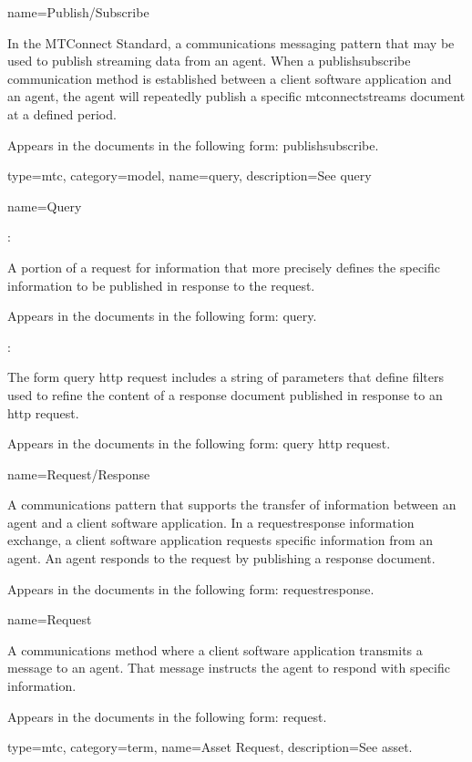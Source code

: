 {
  name={Publish/Subscribe}
}
{
	In the MTConnect Standard, a communications messaging pattern that may be used to publish \gls{streaming data} from an \gls{agent}.  When a \gls{publishsubscribe} communication method is established between a client software application and an \gls{agent}, the \gls{agent} will repeatedly publish a specific \gls{mtconnectstreams} document at a defined period.

	Appears in the documents in the following form: \gls{publishsubscribe}.
}

{
  type=mtc,
  category=model,
  name={query},
  description={See \gls{query}}
}



{
  name={Query}
}
{
	:

	A portion of a request for information that more precisely defines the specific information to be published in response to the request. 

	Appears in the documents in the following form: \gls{query}.

	:

	The form \gls{query http request} includes a string of parameters that define filters used to refine the content of a \gls{response document} published in response to an \gls{http request}.

	Appears in the documents in the following form: \gls{query http request}.
}


{
  name={Request/Response}
}
{
	A communications pattern that supports the transfer of information between an \gls{agent} and a client software application. In a \gls{requestresponse} information exchange, a client software application requests specific information from an \gls{agent}. An \gls{agent} responds to the \gls{request} by publishing a \gls{response document}.   

	Appears in the documents in the following form: \gls{requestresponse}.
}


{
  name={Request}
}
{
	A communications method where a client software application transmits a message to an \gls{agent}.  That message instructs the \gls{agent} to respond with specific information.

	Appears in the documents in the following form: \gls{request}.
}

{
  type=mtc,
  category=term,
  name={Asset Request},
  description={See \gls{asset}.}
}


